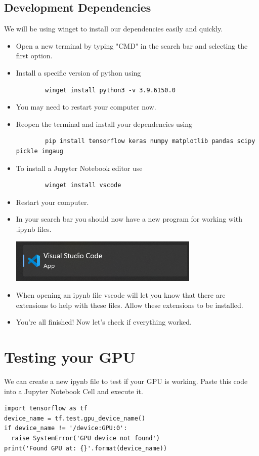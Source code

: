 \documentclass[11pt]{report}
\begin{document}
\section{Development Dependencies}
We will be using winget to install our dependencies easily and quickly.
\begin{itemize}
    \item Open a new terminal by typing "CMD" in the search bar and selecting the first option.
    \item Install a specific version of python using 
    \begin{verbatim}
        winget install python3 -v 3.9.6150.0
    \end{verbatim}
    \item You may need to restart your computer now.
    \item Reopen the terminal and install your dependencies using 
    \begin{verbatim}
        pip install tensorflow keras numpy matplotlib pandas scipy pickle imgaug
    \end{verbatim}
    \item To install a Jupyter Notebook editor use 
    \begin{verbatim}
        winget install vscode
    \end{verbatim}
    \item Restart your computer.
    \item In your search bar you should now have a new program for working with .ipynb files.
    \begin{center}
    \includegraphics{vscode.png}
    \end{center}
    \item When opening an ipynb file vscode will let you know that there are extensions to help with these files. Allow these extensions to be installed.
    \item You're all finished! Now let's check if everything worked.
\end{itemize}
        

\chapter{Testing your GPU}
We can create a new ipynb file to test if your GPU is working. Paste this code into a Jupyter Notebook Cell and execute it. 
\begin{verbatim}
import tensorflow as tf
device_name = tf.test.gpu_device_name()
if device_name != '/device:GPU:0':
  raise SystemError('GPU device not found')
print('Found GPU at: {}'.format(device_name))
\end{verbatim}
\end{document}
